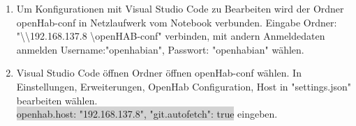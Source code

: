\begin{enumerate}
\item Um Konfigurationen mit Visual Studio Code zu Bearbeiten wird der Ordner openHab-conf in Netzlaufwerk vom Notebook verbunden. Eingabe Ordner: "\textbackslash \textbackslash 192.168.137.8 \textbackslash openHAB-conf" verbinden, mit andern Anmeldedaten anmelden Username:"openhabian", Passwort: "openhabian" wählen.

\item Visual Studio Code öffnen Ordner öffnen openHab-conf wählen. In Einstellungen, Erweiterungen, OpenHab Configuration, Host in "settings.json" bearbeiten wählen. \\
\colorbox{lightgray}{openhab.host: "192.168.137.8",
	"git.autofetch": true} eingeben.
   
   
 \end{enumerate}